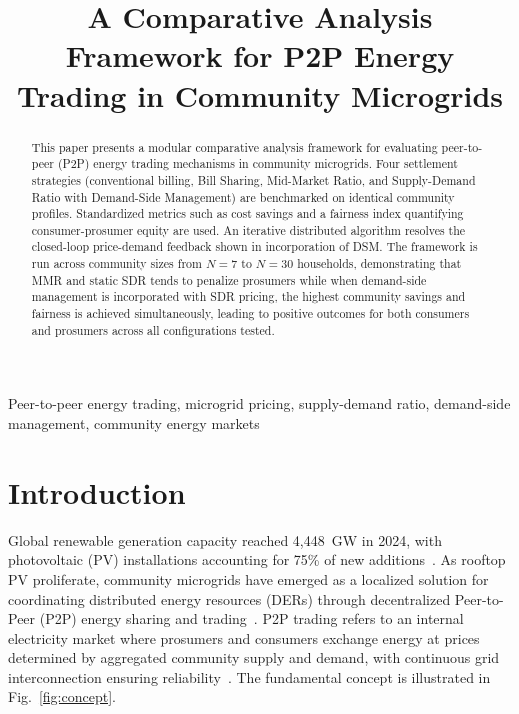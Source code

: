 \documentclass[conference]{IEEEtran}
\begin{document}
\title{A Comparative Analysis Framework for P2P Energy Trading in Community Microgrids}

\author{
}

\maketitle

\begin{abstract}
This paper presents a modular comparative analysis framework for evaluating peer-to-peer (P2P) energy trading mechanisms in community microgrids. Four settlement strategies (conventional billing, Bill Sharing, Mid-Market Ratio, and Supply-Demand Ratio with Demand-Side Management) are benchmarked on identical community profiles.
Standardized metrics such as cost savings and a fairness index quantifying consumer-prosumer equity are used. An iterative distributed algorithm resolves the closed-loop price-demand feedback shown in incorporation of DSM. The framework is run across community sizes from $N=7$ to $N=30$ households, demonstrating that MMR and static SDR tends to penalize prosumers while when demand-side management is incorporated with SDR pricing, the highest community savings and fairness is achieved simultaneously, leading to positive outcomes for both consumers and prosumers across all configurations tested.
\end{abstract}

\begin{IEEEkeywords}
Peer-to-peer energy trading, microgrid pricing, supply-demand ratio, demand-side management, community energy markets
\end{IEEEkeywords}

\section{Introduction}

Global renewable generation capacity reached 4,448~GW in 2024, with photovoltaic (PV) installations accounting for 75\% of new additions~\cite{irena2025}. As rooftop PV proliferate, community microgrids have emerged as a localized solution for coordinating distributed energy resources (DERs) through decentralized Peer-to-Peer (P2P) energy sharing and trading~\cite{sousa2019}. P2P trading refers to an internal electricity market where prosumers and consumers exchange energy at prices determined by aggregated community supply and demand, with continuous grid interconnection ensuring reliability~\cite{zhou2023}. The fundamental concept is illustrated in Fig.~\ref{fig:concept}.
\end{document}
